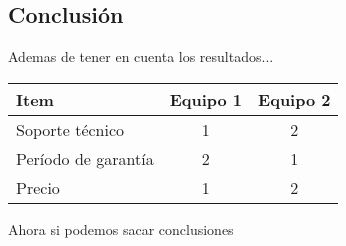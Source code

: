 \subsection{Conclusión}
Ademas de tener en cuenta los resultados...

\begin{center}
\begin{tabular}{|lcc|} \hline
\footnotesize\textbf{Item} & \footnotesize\textbf{Equipo 1} & \footnotesize\textbf{Equipo 2} \\\hline
Soporte técnico & 1 & 2 \\\hline
Período de garantía & 2 & 1 \\\hline
Precio & 1 & 2 \\\hline
\end{tabular}
\end{center}

Ahora si podemos sacar conclusiones